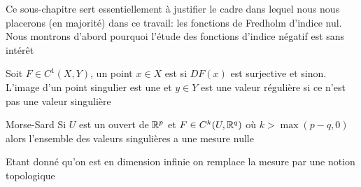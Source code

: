 \documentclass[memoire.tex]{subfiles}
\begin{document}
Ce sous-chapitre sert essentiellement à justifier le cadre dans lequel nous nous placerons (en majorité) dans ce travail: les fonctions de Fredholm d'indice nul. Nous montrons d'abord pourquoi l'étude des fonctions d'indice négatif est sans intérêt
\begin{definition}
    Soit $F\in C^1(X,Y)$, un point $x\in X$ est 
     si $DF(x)$ est surjective 
    et  sinon. L'image d'un 
    point singulier est une  et $y\in Y$ est une \coldef
    {valeur régulière} si ce n'est pas une 
    valeur singulière
\end{definition}

\begin{theobox}{Morse-Sard}{}\label{morse-sard}
    Si $U$ est un ouvert de $\mathbb{R}^p$ et $F\in C^k(U,\mathbb{R}^q)$ où $k>\max(p-q,0)$ alors l'ensemble des valeurs singulières a une mesure nulle 
\end{theobox}

Etant donné qu'on est en dimension infinie on remplace la mesure par une notion topologique
\end{document}
